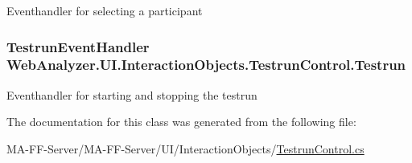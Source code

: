 Eventhandler for selecting a participant 

\hypertarget{class_web_analyzer_1_1_u_i_1_1_interaction_objects_1_1_testrun_control_aec90f2bc94369619608e0059453752d3}{}
\subsubsection[{Testrun}]{\setlength{\rightskip}{0pt plus 5cm}Testrun\+Event\+Handler Web\+Analyzer.\+U\+I.\+Interaction\+Objects.\+Testrun\+Control.\+Testrun}\label{class_web_analyzer_1_1_u_i_1_1_interaction_objects_1_1_testrun_control_aec90f2bc94369619608e0059453752d3}


Eventhandler for starting and stopping the testrun 



The documentation for this class was generated from the following file\+:\begin{DoxyCompactItemize}
\item 
M\+A-\/\+F\+F-\/\+Server/\+M\+A-\/\+F\+F-\/\+Server/\+U\+I/\+Interaction\+Objects/\hyperlink{_testrun_control_8cs}{Testrun\+Control.\+cs}\end{DoxyCompactItemize}
